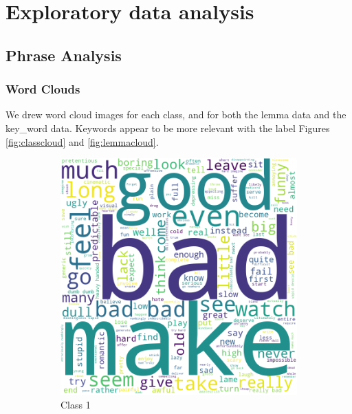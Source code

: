 \documentclass[10pt, a4paper]{article}
\begin{document}
\section{Exploratory data analysis}

\subsection{Phrase Analysis}
\subsubsection{Word Clouds}
We drew word cloud images for each class, and for both the lemma data and the key\_word data. Keywords appear to be more relevant with the label Figures \ref{fig:classcloud} and \ref{fig:lemmacloud}.

\begin{figure}[h]
     \centering
     \begin{subfigure}[b]{0.18\textwidth}
         \centering
         \includegraphics[width=\textwidth]{keywords1.png}
         \caption{Class 1}
         \label{fig:class1cloud}
     \end{subfigure}
     \hfill
     \begin{subfigure}[b]{0.18\textwidth}
         \centering

\end{subfigure}
\end{figure}
\end{document}
